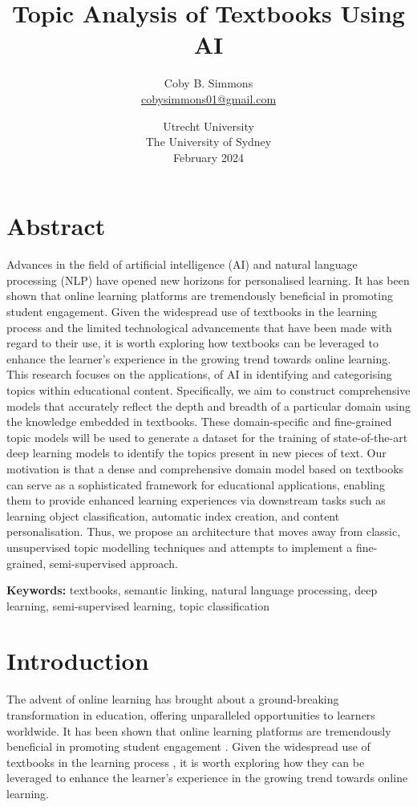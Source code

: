 \documentclass[twocolumn]{article}
\title{Topic Analysis of Textbooks Using AI}
\author{
    Coby B. Simmons \\
    \small{\href{mailto:cobysimmons01@gmail.com}{cobysimmons01@gmail.com}}
}
\date{
    Utrecht University\\%
    The University of Sydney\\[2ex]%
    February 2024
}
\begin{document}
\maketitle

\section*{Abstract}
Advances in the field of artificial intelligence (AI) and natural language processing (NLP) have opened new horizons for personalised learning.
It has been shown that online learning platforms are tremendously beneficial in promoting student engagement. Given the widespread use of textbooks in the learning process and the limited technological advancements that have been made with regard to their use, it is worth exploring how textbooks can be leveraged to enhance the learner's experience in the growing trend towards online learning.
This research focuses on the applications, of AI in identifying and categorising topics within educational content. 
Specifically, we aim to construct comprehensive models that accurately reflect the depth and breadth of a particular domain using the knowledge embedded in textbooks. These domain-specific and fine-grained topic models will be used to generate a dataset for the training of state-of-the-art deep learning models to identify the topics present in new pieces of text.
Our motivation is that a dense and comprehensive domain model based on textbooks can serve as a sophisticated framework for educational applications, enabling them to provide enhanced learning experiences via downstream tasks such as learning object classification, automatic index creation, and content personalisation.
Thus, we propose an architecture that moves away from classic, unsupervised topic modelling techniques and attempts to implement a fine-grained, semi-supervised approach.


\textbf{Keywords:} \quad textbooks, semantic linking, natural language processing, deep learning, semi-supervised learning, topic classification

\section{Introduction}

The advent of online learning has brought about a ground-breaking transformation in education, offering unparalleled opportunities to learners worldwide. It has been shown that online learning platforms are tremendously beneficial in promoting student engagement \cite{benta2014}. Given the widespread use of textbooks in the learning process \cite{kumar1986}, it is worth exploring how they can be leveraged to enhance the learner's experience in the growing trend towards online learning.
\end{document}

